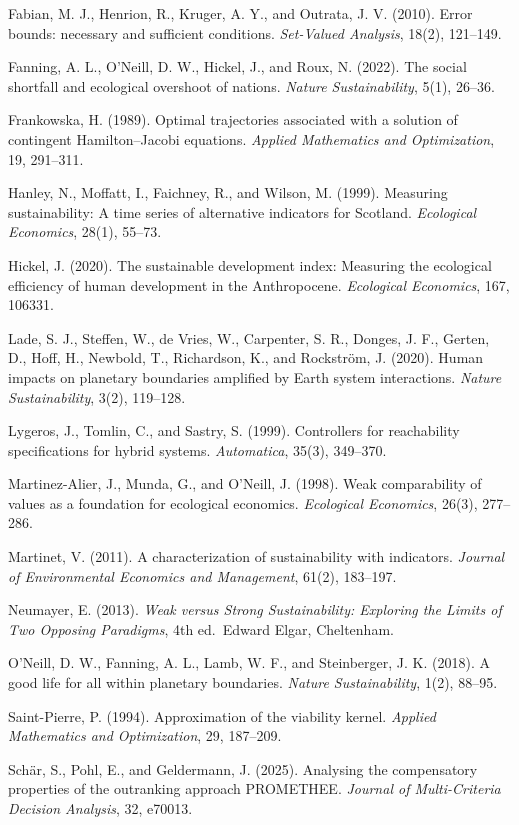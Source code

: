 \documentclass[review,11pt]{elsarticle}
\begin{document}
Fabian, M. J., Henrion, R., Kruger, A. Y., and Outrata, J. V. (2010). Error bounds: necessary and sufficient conditions. \emph{Set-Valued Analysis}, 18(2), 121--149.

Fanning, A. L., O'Neill, D. W., Hickel, J., and Roux, N. (2022). The social shortfall and ecological overshoot of nations. \emph{Nature Sustainability}, 5(1), 26--36.

Frankowska, H. (1989). Optimal trajectories associated with a solution
of contingent Hamilton--Jacobi equations. \emph{Applied Mathematics and
Optimization}, 19, 291--311.

Hanley, N., Moffatt, I., Faichney, R., and Wilson, M. (1999). Measuring
sustainability: A time series of alternative indicators for Scotland.
\emph{Ecological Economics}, 28(1), 55--73.

Hickel, J. (2020). The sustainable development index: Measuring the
ecological efficiency of human development in the Anthropocene.
\emph{Ecological Economics}, 167, 106331.

Lade, S. J., Steffen, W., de Vries, W., Carpenter, S. R., Donges, J. F., Gerten, D., Hoff, H., Newbold, T., Richardson, K., and Rockstr\"om, J. (2020). Human impacts on planetary boundaries amplified by Earth system interactions. \emph{Nature Sustainability}, 3(2), 119--128.

Lygeros, J., Tomlin, C., and Sastry, S. (1999). Controllers for
reachability specifications for hybrid systems. \emph{Automatica},
35(3), 349--370.

Martinez-Alier, J., Munda, G., and O'Neill, J. (1998). Weak
comparability of values as a foundation for ecological economics.
\emph{Ecological Economics}, 26(3), 277--286.

Martinet, V. (2011). A characterization of sustainability with
indicators. \emph{Journal of Environmental Economics and Management},
61(2), 183--197.

Neumayer, E. (2013). \emph{Weak versus Strong Sustainability: Exploring
the Limits of Two Opposing Paradigms}, 4th ed.~Edward Elgar, Cheltenham.

O'Neill, D. W., Fanning, A. L., Lamb, W. F., and Steinberger, J. K. (2018). A good life for all within planetary boundaries. \emph{Nature Sustainability}, 1(2), 88--95.

Saint-Pierre, P. (1994). Approximation of the viability kernel.
\emph{Applied Mathematics and Optimization}, 29, 187--209.

Sch\"ar, S., Pohl, E., and Geldermann, J. (2025). Analysing the
compensatory properties of the outranking approach PROMETHEE.
\emph{Journal of Multi-Criteria Decision Analysis}, 32, e70013.
\end{document}
